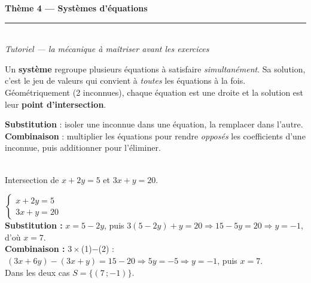 \documentclass[11pt,a4paper]{article}
\begin{document}
\begin{center}
{\LARGE\bfseries\color{primarydark} Thème 4 — Systèmes d'équations}\\[2pt]
{\color{primary}\rule{0.5\textwidth}{1.2pt}}\\[4pt]
{\small\itshape Tutoriel — la mécanique à maîtriser avant les exercices}
\end{center}

\vspace{1mm}
\noindent Un \textbf{système} regroupe plusieurs équations à satisfaire \emph{simultanément}. Sa
solution, c'est le jeu de valeurs qui convient à \emph{toutes} les équations à la fois.
Géométriquement (2 inconnues), chaque équation est une droite et la solution est leur
\textbf{point d'intersection}.

\begin{minipage}{0.56\textwidth}
\begin{cle}
\textbf{Substitution} : isoler une inconnue dans une équation, la remplacer dans l'autre.\\[2pt]
\textbf{Combinaison} : multiplier les équations pour rendre \emph{opposés} les coefficients d'une
inconnue, puis additionner pour l'éliminer.
\end{cle}
\end{minipage}\hfill
\begin{minipage}{0.4\textwidth}
\centering
{}\\[-1mm]
{\scriptsize Intersection de $x+2y=5$ et $3x+y=20$.}
\end{minipage}

\begin{exemplebox}
$\begin{cases} x+2y=5\\ 3x+y=20\end{cases}$\\[2pt]
\textbf{Substitution :} $x=5-2y$, puis $3(5-2y)+y=20\Rightarrow 15-5y=20\Rightarrow y=-1$, d'où $x=7$.\\
\textbf{Combinaison :} $3\times$(1)$-$(2) : $\ (3x+6y)-(3x+y)=15-20\Rightarrow 5y=-5\Rightarrow y=-1$, puis $x=7$.\\
Dans les deux cas $S=\{(7\,;-1)\}$.
\end{exemplebox}
\end{document}
